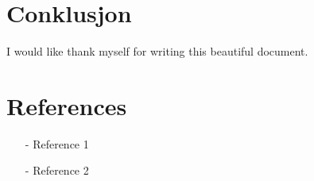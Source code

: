\documentclass[reprint,english,notitlepage]{revtex4-2}  %
\begin{document}
\section{Conklusjon}
\begin{acknowledgments}  %
I would like thank myself for writing this beautiful document.
\end{acknowledgments}


\section*{References}  %
\begin{itemize}
\item[-]Reference 1
\item[-]Reference 2
\end{itemize}

\newpage
\appendix
\end{document}
